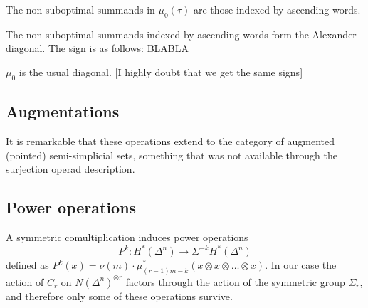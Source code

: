 \begin{proposition}
    The non-suboptimal summands in $\mu_0(\tau)$ are those indexed by ascending words.
\end{proposition}

\begin{proposition}
    The non-suboptimal summands indexed by ascending words form the Alexander diagonal. The sign is as follows: BLABLA
\end{proposition}

\begin{corollary}
    $\mu_0$ is the usual diagonal. [I highly doubt that we get the same signs]
\end{corollary}

\subsection{Augmentations} It is remarkable that these operations extend to the category of augmented (pointed) semi-simplicial sets, something that was not available through the surjection operad description.

\subsection{Power operations} A symmetric comultiplication induces power operations
\[P^k\colon H^*(\Delta^n)\to \Sigma^{-k} H^*(\Delta^n)\]
defined as $P^k(x) =\nu(m)\cdot \mu_{(r-1)m-k}^*(x\otimes x\otimes\ldots\otimes x)$. In our case the action of $C_r$ on $N(\Delta^n)^{\otimes r}$ factors through the action of the symmetric group $\Sigma_r$, and therefore only some of these operations survive.
